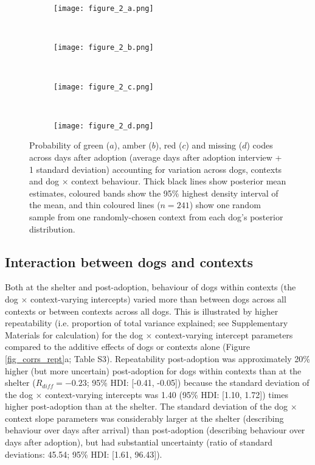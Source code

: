 \documentclass[12pt]{article}
\begin{document}
\begin{figure}
  \hspace{-2cm}%
  \begin{subfigure}{0.4\textwidth}
    \centering
    \texttt{[image: figure\_2\_a.png]}
  \end{subfigure}%
  ~%
  \hspace{-2cm}
  \begin{subfigure}{0.4\textwidth}
    \centering
    \texttt{[image: figure\_2\_b.png]}
  \end{subfigure}%
  ~%
  \hspace{-2cm}
  \begin{subfigure}{0.4\textwidth}
    \centering
    \texttt{[image: figure\_2\_c.png]}
  \end{subfigure}%
  ~%
  \hspace{-2cm}
  \begin{subfigure}{0.4\textwidth}
    \centering
    \texttt{[image: figure\_2\_d.png]}
  \end{subfigure}%

  \caption{Probability of green ($a$), amber ($b$), red ($c$) and missing ($d$) codes across days after adoption (average days after adoption interview + 1 standard deviation)  accounting for variation across dogs, contexts and dog $\times$ context behaviour. Thick black lines show posterior mean estimates, coloured bands show the 95\% highest density interval of the mean, and thin coloured lines ($n = 241$) show one random sample from one randomly-chosen context from each dog's posterior distribution.}
  \label{fig_adoption_behaviour}
\end{figure}

\subsection{Interaction between dogs and contexts}
Both at the shelter and post-adoption, behaviour of dogs within contexts (the dog $\times$ context-varying intercepts) varied more than between dogs across all contexts or between contexts across all dogs. This is illustrated by higher repeatability (i.e. proportion of total variance explained; see Supplementary Materials for calculation) for the dog $\times$ context-varying intercept parameters compared to the additive effects of dogs or contexts alone (Figure \ref{fig_corrs_rept}a; Table S3). Repeatability post-adoption was approximately 20\% higher (but more uncertain) post-adoption for dogs within contexts than at the shelter ($R_{diff} = -0.23$; 95\% HDI: [-0.41, -0.05]) because the standard deviation of the dog $\times$ context-varying intercepts was 1.40 (95\% HDI: [1.10, 1.72]) times higher post-adoption than at the shelter. The standard deviation of the dog $\times$ context slope parameters was considerably larger at the shelter (describing behaviour over days after arrival) than post-adoption (describing behaviour over days after adoption), but had substantial uncertainty (ratio of standard deviations: 45.54; 95\% HDI: [1.61, 96.43]).
\end{document}
